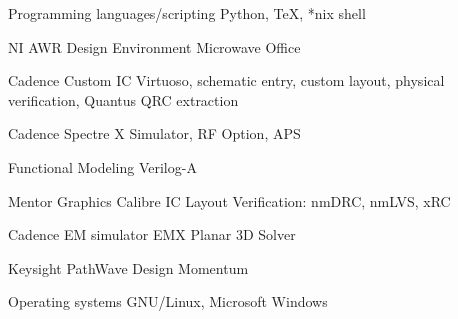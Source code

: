 


\begin{cvskills}


\cvskill
{Programming languages/scripting} %
{Python, TeX, *nix shell} %


\cvskill
{NI AWR Design Environment} %
{Microwave Office} %


\cvskill
{Cadence Custom IC} %
{Virtuoso, schematic entry, custom layout, physical verification, Quantus QRC extraction} %

\cvskill
{Cadence Spectre X} %
{Simulator, RF Option, APS} %

\cvskill
{Functional Modeling} %
{Verilog-A} %

\cvskill
{Mentor Graphics} %
{Calibre IC Layout Verification: nmDRC, nmLVS, xRC} %


\cvskill
{Cadence EM simulator} %
{EMX Planar 3D Solver} %


\cvskill
{Keysight PathWave Design} %
{Momentum} %

\cvskill
{Operating systems} %
{GNU/Linux, Microsoft Windows} %


\end{cvskills}
